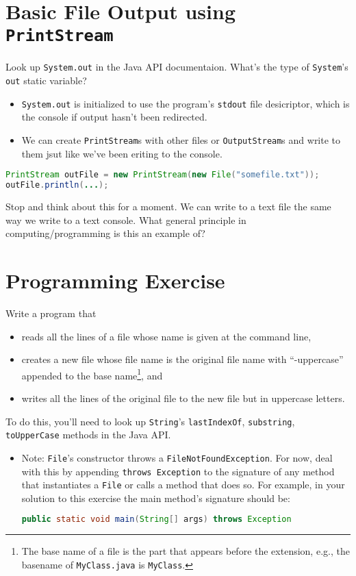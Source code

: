 \documentclass{article}
\begin{document}
\section{Basic File Output using {\tt PrintStream}}

Look up {\tt System.out} in the Java API documentaion.  What's the type of {\tt System}'s {\tt out} static variable?

\begin{itemize}
\item {\tt System.out} is initialized to use the program's {\tt stdout} file desicriptor, which is the console if output hasn't been redirected.
\item We can create {\tt PrintStream}s with other files or {\tt OutputStream}s and write to them jsut like we've been eriting to the console.
\end{itemize}

\begin{lstlisting}[language=Java]
PrintStream outFile = new PrintStream(new File("somefile.txt"));
outFile.println(...);
\end{lstlisting}

Stop and think about this for a moment.  We can write to a text file the same way we write to a text console.  What general principle in computing/programming is this an example of?


\section{Programming Exercise}

Write a program that
\begin{itemize}
\item reads all the lines of a file whose name is given at the command line,
\item creates a new file whose file name is the original file name with ``-uppercase'' appended to the base name\footnote{The base name of a file is the part that appears before the extension, e.g., the basename of {\tt MyClass.java} is {\tt MyClass}.}, and
\item writes all the lines of the original file to the new file but in uppercase letters.
\end{itemize}
To do this, you'll need to look up {\tt String}'s {\tt lastIndexOf}, {\tt substring}, {\tt toUpperCase} methods in the Java API.

\begin{itemize}
\item Note: {\tt File}'s constructor throws a {\tt FileNotFoundException}.  For now, deal with this by appending {\tt throws Exception} to the signature of any method that instantiates a {\tt File} or calls a method that does so.  For example, in your solution to this exercise the main method's signature should be:

\begin{lstlisting}[language=Java]
public static void main(String[] args) throws Exception
\end{lstlisting}

\end{itemize}
\end{document}
